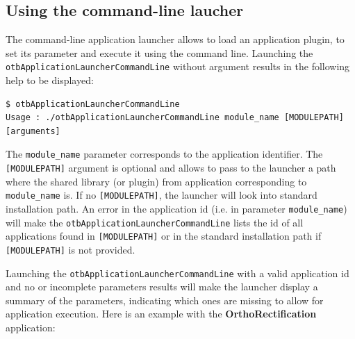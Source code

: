 \subsection{Using the command-line laucher}

The command-line application launcher allows to load an application
plugin, to set its parameter and execute it using the command
line. Launching the \verb?otbApplicationLauncherCommandLine?
without argument results in the following help to be displayed:

\begin{verbatim}
$ otbApplicationLauncherCommandLine 
Usage : ./otbApplicationLauncherCommandLine module_name [MODULEPATH] [arguments]
\end{verbatim} 

The \verb?module_name? parameter corresponds to the application
identifier. The \verb?[MODULEPATH]? argument is optional and allows 
to pass to the launcher a path where the shared library (or plugin) from
application corresponding to \verb?module_name? is. If no
\verb?[MODULEPATH]?, the launcher will look into standard \otb
installation path. An error in the application id (i.e. in parameter
\verb?module_name?) will make the
\verb?otbApplicationLauncherCommandLine? lists the id of all
applications found in \verb?[MODULEPATH]? or in the standard \otb
installation path if \verb?[MODULEPATH]? is not provided.

Launching the \verb?otbApplicationLauncherCommandLine? with a valid
application id and no or incomplete parameters results will make the
launcher display a summary of the parameters, indicating which ones
are missing to allow for application execution. Here is an example
with the \textbf{OrthoRectification} application:

